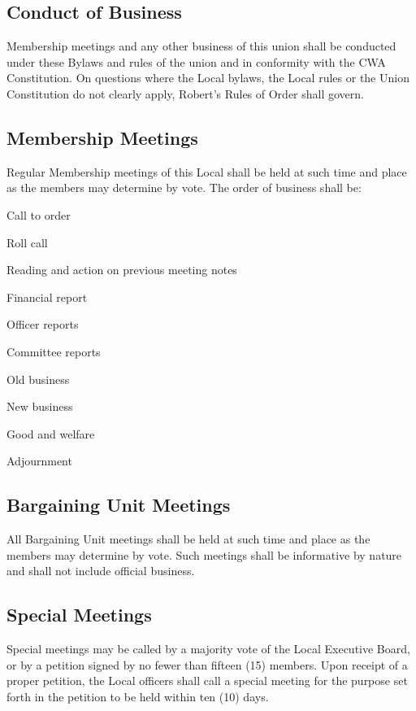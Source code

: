 \documentclass[11pt]{article}
\begin{document}
\subsection{Conduct of Business}
Membership meetings and any other business of this union shall be conducted under these Bylaws and rules of the union and in conformity with the CWA Constitution. On questions where the Local bylaws, the Local rules or the Union Constitution do not clearly apply, Robert's Rules of Order shall govern.

\subsection{Membership Meetings}
Regular Membership meetings of this Local shall be held at such time and place as the members may determine by vote. The order of business shall be:

\begin{numberlist}
\item Call to order
\item Roll call
\item Reading and action on previous meeting notes
\item Financial report
\item Officer reports
\item Committee reports
\item Old business
\item New business
\item Good and welfare
\item Adjournment
\end{numberlist}

\subsection{Bargaining Unit Meetings}
All Bargaining Unit meetings shall be held at such time and place as the members may determine by vote. Such meetings shall be informative by nature and shall not include official business.

\subsection{Special Meetings}\label{special-meetings}
Special meetings may be called by a majority vote of the Local Executive Board, or by a petition signed by no fewer than fifteen (15) members. Upon receipt of a proper petition, the Local officers shall call a special meeting for the purpose set forth in the petition to be held within ten (10) days.
\end{document}
